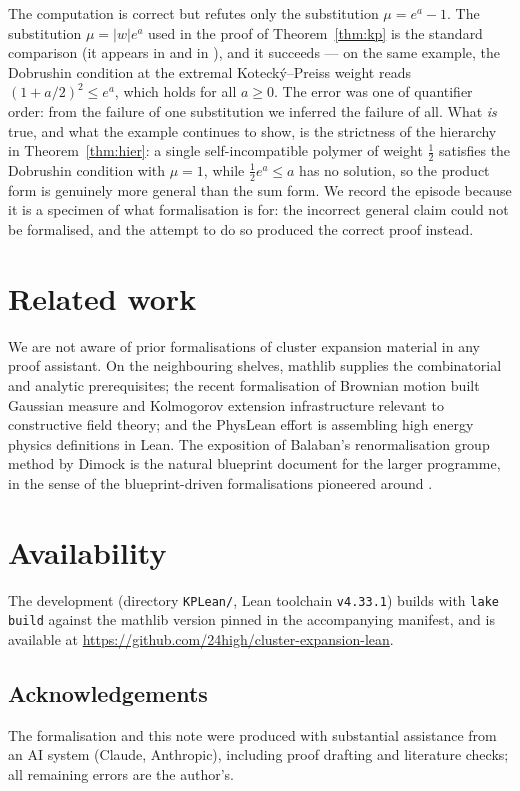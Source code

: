 \documentclass[11pt]{amsart}
\begin{document}
The computation is correct but refutes only the substitution
$\mu = e^{a}-1$. The substitution $\mu = \lvert w \rvert e^{a}$ used in the
proof of Theorem~\ref{thm:kp} is the standard comparison (it appears in
\cite{FP07} and in \cite{SS05}), and it succeeds — on the same example,
the Dobrushin condition at the extremal Kotecký--Preiss weight reads
$(1 + a/2)^2 \le e^{a}$, which holds for all $a \ge 0$. The error was one
of quantifier order: from the failure of one substitution we inferred the
failure of all. What \emph{is} true, and what the example continues to
show, is the strictness of the hierarchy in Theorem~\ref{thm:hier}: a
single self-incompatible polymer of weight $\tfrac12$ satisfies the
Dobrushin condition with $\mu = 1$, while $\tfrac12 e^{a} \le a$ has no
solution, so the product form is genuinely more general than the sum form.
We record the episode because it is a specimen of what formalisation is
for: the incorrect general claim could not be formalised, and the attempt
to do so produced the correct proof instead.

\section{Related work}

We are not aware of prior formalisations of cluster expansion material in
any proof assistant. On the neighbouring shelves, \textsf{mathlib}
\cite{mathlib20} supplies the combinatorial and analytic prerequisites; the
recent formalisation of Brownian motion \cite{BM25} built Gaussian measure
and Kolmogorov extension infrastructure relevant to constructive field
theory; and the PhysLean effort \cite{HepLean} is assembling high energy
physics definitions in Lean. The exposition of Balaban's renormalisation
group method by Dimock \cite{Dim13a,Dim13b,Dim13c} is the natural blueprint
document for the larger programme, in the sense of the blueprint-driven
formalisations pioneered around \cite{LTE}.

\section{Availability}

The development (directory \texttt{KPLean/}, Lean toolchain
\texttt{v4.33.1}) builds with \texttt{lake build} against the
\textsf{mathlib} version pinned in the accompanying manifest, and is
available at
\url{https://github.com/24high/cluster-expansion-lean}.

\subsection*{Acknowledgements}
The formalisation and this note were produced with substantial assistance
from an AI system (Claude, Anthropic), including proof drafting and
literature checks; all remaining errors are the author's.
\end{document}
